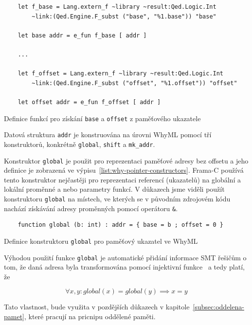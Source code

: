 \begin{listing}[H]
    \begin{verbatim}
    let f_base = Lang.extern_f ~library ~result:Qed.Logic.Int
        ~link:(Qed.Engine.F_subst ("base", "%1.base")) "base"

    let base addr = e_fun f_base [ addr ]

    ...

    let f_offset = Lang.extern_f ~library ~result:Qed.Logic.Int
        ~link:(Qed.Engine.F_subst ("offset", "%1.offset")) "offset"

    let offset addr = e_fun f_offset [ addr ]
    \end{verbatim}
    \caption{Definice funkcí pro získání \texttt{base} a \texttt{offset} z paměťového ukazatele}
    \label{list:why-addr-base-offset}
\end{listing}

Datová struktura \texttt{addr} je konstruována na úrovni WhyML pomocí tří konstruktorů,
konkrétně \texttt{global}, \texttt{shift} a \texttt{mk\_addr}.

Konstruktor \texttt{global} je použit pro reprezentaci paměťové adresy bez offsetu
a jeho definice je zobrazená ve výpisu~\ref{list:why-pointer-constructors}.
Frama\mbox{-}C používá tento konstruktor nejčastěji
pro reprezentaci referencí (ukazatelů) na globální a lokální proměnné a nebo parametry funkcí.
V důkazech jsme viděli použít konstruktoru \texttt{global} na místech,
ve kterých se v původním zdrojovém kódu nachází získávání adresy proměnných pomocí operátoru \texttt{\&}.

\begin{listing}[H]
    \begin{verbatim}
    function global (b: int) : addr = { base = b ; offset = 0 }
    \end{verbatim}
    \caption{Definice konstruktoru \texttt{global} pro paměťový ukazatel ve WhyML}
    \label{list:why-pointer-constructors}
\end{listing}

Výhodou použití funkce \texttt{global} je automatické přidání informace SMT řešičům o tom,
že daná adresa byla transformována pomocí injektivní funkce~\cite{BlanchardWP2024}
a tedy platí, že

\begin{equation*}
    \forall x, y : global(x) = global(y) \implies x = y
\end{equation*}

Tato vlastnost, bude využita v pozdějších důkazech v kapitole~\ref{subsec:oddelena-pamet},
které pracují na pricnipu oddělené paměti.

